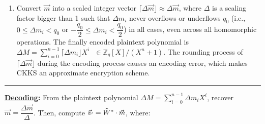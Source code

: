 \begin{tcolorbox}[title={\textbf{\tboxlabel{\ref*{subsec:ckks-encoding-decoding}} CKKS's Encoding and Decoding}}]
\begin{enumerate}
\textcolor{red}{ $\rhd$ where $\omega = e^{i\pi/n} = \cos \left(\dfrac{\pi}{n}\right) + i\sin \left(\dfrac{\pi}{n}\right)$,  $J(h) = 5^h \bmod 2n$,  and  $J_*(h) = -5^h \bmod 2n$}

\small{\noindent $ = \begin{bmatrix}
1 & 1 & \cdots & 1 & 1 & 1 & \cdots & 1\\
(\omega^{J(\frac{n}{2} - 1)}) & (\omega^{J(\frac{n}{2} - 2)}) & \cdots & (\omega^{J(0)}) & (\overline\omega^{J(\frac{n}{2} - 1)}) & (\overline\omega^{J(\frac{n}{2} - 2)}) & \cdots & (\overline\omega^{J(0)})\\
(\omega^{J(\frac{n}{2} - 1)})^2 & (\omega^{J(\frac{n}{2} - 2)})^2 & \cdots & (\omega^{J(0)})^2 & (\overline\omega^{J(\frac{n}{2} - 1)})^2 & (\overline\omega^{J(\frac{n}{2} - 2)})^2 & \cdots & (\overline\omega^{J(0)})^2 \\
\vdots & \vdots & \ddots & \vdots & \vdots & \ddots & \vdots & \vdots \\
(\omega^{J(\frac{n}{2} - 1)})^{n-1} & (\omega^{J(\frac{n}{2} - 2)})^{n-1} & \cdots & (\omega^{J(0)})^{n-1} & (\overline\omega^{J(\frac{n}{2} - 1)})^{n-1} & (\overline\omega^{J(\frac{n}{2} - 2)})^{n-1} & \vdots  & (\overline\omega^{J(0)})^{n-1}
\end{bmatrix}$}

\textcolor{red}{ $\rhd$ because $\omega^{-1} = e^{\frac{-i\pi}{n}} = \overline{e^{\frac{i\pi}{n}}} = \overline\omega$}

$ $

\item Convert $\vec{m}$ into a scaled integer vector $\lceil \Delta\vec{m} \rfloor \approx \Delta \vec{m}$, where $\Delta$ is a scaling factor bigger than 1 such that $\Delta m_i$ never overflows or underflows $q_0$ (i.e., $0 \leq \Delta m_i < q_0$ or $-\dfrac{q_0}{2} \leq \Delta m_i < \dfrac{q_0}{2}$) in all cases, even across all homomorphic operations. The finally encoded plaintext polynomial is $\Delta M = \sum\limits_{i=0}^{n-1} \lceil \Delta m_i \rfloor X^i \text{ } \in \mathbb{Z}_q[X] / (X^n + 1)$. The rounding process of $\lceil \Delta \vec{m} \rfloor$ during the encoding process causes an encoding error, which makes CKKS an approximate encryption scheme. 

\end{enumerate}

\par\noindent\rule{\textwidth}{0.4pt}

\textbf{\underline{Decoding}: } From the plaintext polynomial $\Delta M = \sum\limits_{i=0}^{n-1}\Delta m_iX^i$, recover $\vec{m} = \dfrac{\Delta \vec{m}}{\Delta}$. Then,
compute $\vec{v}_{'} = \tilde W^* \cdot \vec{m}$, where:


\end{tcolorbox}

